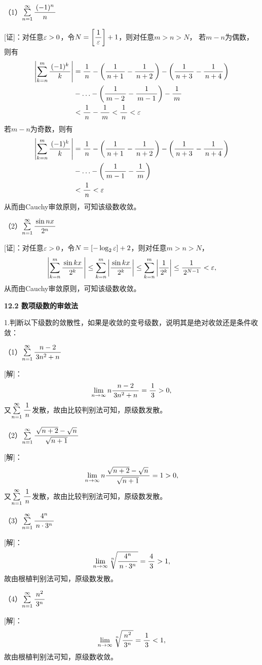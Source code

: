 （1）$\sumn\df{(-1)^{n}}n$

[证]：对任意$\e>0$，令$N=\left[\df1{\e}\right]+1$，则对任意$m>n>N$，
若$m-n$为偶数，则有
\begin{align*}
	\left|\sum\limits_{k=n}^m\df{(-1)^{k}}k\right|
	&=\df1n-\left(\df1{n+1}-\df1{n+2}\right)
	-\left(\df1{n+3}-\df1{n+4}\right)\\
	&-\ldots
	-\left(\df1{m-2}-\df1{m-1}\right)-\df1m\\
	&<\df1n-\df1m<\df1n<\e
\end{align*}
若$m-n$为奇数，则有
\begin{align*}
	\left|\sum\limits_{k=n}^m\df{(-1)^{k}}k\right|
	&=\df1n-\left(\df1{n+1}-\df1{n+2}\right)
	-\left(\df1{n+3}-\df1{n+4}\right)\\
	&-\ldots-\left(\df1{m-1}-\df1m\right)\\
	&<\df1n<\e
\end{align*}
从而由Cauchy审敛原则，可知该级数收敛。

（2）$\sumn\df{\sin nx}{2^n}$

[证]：对任意$\e>0$，令$N=\left[-\log_2\e\right]+2$，则对任意$m>n>N$，
$$
	\left|\sum\limits_{k=n}^m\df{\sin kx}{2^k}\right|
	\leq\sum\limits_{k=n}^m\left|\df{\sin kx}{2^k}\right|
	\leq\sum\limits_{k=n}^m\left|\df1{2^k}\right|
	\leq\df1{2^{N-1}}<\e,
$$
从而由Cauchy审敛原则，可知该级数收敛。\fin

\begin{center}
	\bf 12.2 数项级数的审敛法
\end{center}

\bs

1.判断以下级数的敛散性，如果是收敛的变号级数，说明其是绝对收敛还是条件收敛：

（1）$\sumn\df{n-2}{3n^2+n}$

[解]：
$$\limn n\df{n-2}{3n^2+n}=\df13>0,$$
又$\sumn\df1n$发散，故由比较判别法可知，原级数发散。

（2）$\sumn\df{\sqrt{n+2}-\sqrt{n}}{\sqrt{n+1}}$

[解]：
$$\limn n\df{\sqrt{n+2}-\sqrt{n}}{\sqrt{n+1}}=1>0,$$
又$\sumn\df1n$发散，故由比较判别法可知，原级数发散。

（3）$\sumn\df{4^n}{n\cdot 3^n}$

[解]：
$$\limn\sqrt[n]{\df{4^n}{n\cdot 3^n}}=\df43>1,$$
故由根植判别法可知，原级数发散。

（4）$\sumn\df{n^2}{3^n}$

[解]：
$$\limn\sqrt[n]{\df{n^2}{3^n}}=\df13<1,$$
故由根植判别法可知，原级数收敛。

